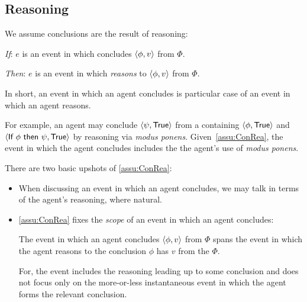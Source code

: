 \subsection{Reasoning}
\label{cha:clar:sec:Concls:reasoning}

\begin{note}
  We assume conclusions are the result of reasoning:

  \begin{assumption}
    \label{assu:ConRea}
    \vspace{-\baselineskip}
    \begin{itenum}
    \item[\emph{If}:]
      \(e\) is an event in which \vAgent{} concludes \(\langle \phi, v \rangle\) from \(\Phi\).
    \item[\emph{Then}:]
      \(e\) is an event in which \vAgent{} \emph{reasons} to \(\langle \phi, v \rangle\) from \(\Phi\).
    \end{itenum}
    \vspace{-\baselineskip}
  \end{assumption}

  \noindent%
  In short, an event in which an agent concludes is particular case of an event in which an agent reasons.

  For example, an agent may conclude \(\pv{\psi}{\valI{True}}\) from a \pool{} containing \(\pv{\phi}{\valI{True}}\) and \(\pv{\propI{If }\phi\propI{ then }\psi}{\valI{True}}\) by reasoning via \emph{modus ponens}.
  Given~\autoref{assu:ConRea}, the event in which the agent concludes includes the the agent's use of \emph{modus ponens}.
\end{note}

\begin{note}
  There are two basic upshots of \autoref{assu:ConRea}:

  \begin{itemize}[noitemsep]
  \item
    When discussing an event in which an agent concludes, we may talk in terms of the agent's reasoning, where natural.
  \item
    \autoref{assu:ConRea} fixes the \emph{scope} of an event in which an agent concludes:

    The event in which an agent concludes \(\langle \phi, v \rangle\) from \(\Phi\) spans the event in which the agent reasons to the conclusion \(\phi\) has  \(v\) from the \pool{} \(\Phi\).

    For, the event includes the reasoning leading up to some conclusion and does not focus only on the more-or-less instantaneous event in which the agent forms the relevant conclusion.
  \end{itemize}
\end{note}

